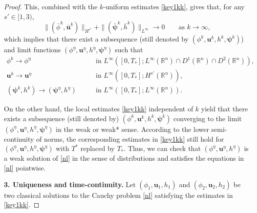 \documentclass[10pt,a4paper]{amsart}
\begin{document}
\begin{proof}
This, combined with the $k$-uniform estimates \eqref{key1kk}, gives that, for any $s'\in [1,3)$,
\begin{equation*}
\|(\bar\phi^{k},\bar {\boldsymbol{u}}^{k})\|_{H^{s'}}+\|(\bar{\boldsymbol{\psi}}^{k},\bar h^{k})\|_{L^\infty}\to 0\qquad \text{as $k\to\infty$},
\end{equation*}
which implies that there exist a subsequence (still denoted by $(\phi^k,\boldsymbol{u}^k,h^k ,\boldsymbol{\psi}^k)$) and limit functions  $(\phi^\eta,\boldsymbol{u}^\eta,h^\eta, \boldsymbol{\psi}^\eta)$ such that
\begin{equation*} 
\begin{aligned}
\phi^k\to \phi^\eta\qquad &\text{in $L^\infty([0,T_*];L^\infty(\mathbb{R}^n)\cap D^1(\mathbb{R}^n)\cap D^2(\mathbb{R}^n))$},\\
\boldsymbol{u}^k\to \boldsymbol{u}^\eta \qquad   &\text{in $L^\infty([0,T_*];H^{s'}(\mathbb{R}^n))$},\\
(\boldsymbol{\psi}^k,h^k)\to (\boldsymbol{\psi}^\eta,h^\eta) \qquad  &\text{in $L^\infty([0,T_*];L^\infty(\mathbb{R}^n))$}.
\end{aligned}
\end{equation*}

On the other hand,    the local estimates  \eqref{key1kk} independent of $k$ yield that there exists a subsequence (still denoted by) $(\phi^k,\boldsymbol{u}^k, h^k, \boldsymbol{\psi}^k)$ converging to the limit $(\phi^\eta,\boldsymbol{u}^\eta, h^\eta, \boldsymbol{\psi}^\eta)$ in the weak or weak* sense.
According to the lower semi-continuity of norms,  the corresponding estimates in \eqref{key1kk} still hold for  $(\phi^\eta,\boldsymbol{u}^\eta, h^\eta,\boldsymbol{\psi}^\eta)$ with $T^*$ replaced by $T_*$. Thus, we can check that  $(\phi^\eta,\boldsymbol{u}^\eta, h^\eta)$ is a weak solution of \eqref{nl} in the sense of distributions and satisfies the equations in \eqref{nl} pointwise.

\smallskip
\textbf{3. Uniqueness and time-continuity.}  Let $(\phi_1,  \boldsymbol{u}_1, h_1)$ and $(\phi_2, \boldsymbol{u}_2, h_2)$ be two classical solutions to the   Cauchy problem \eqref{nl} satisfying the  estimates in \eqref{key1kk}.


\end{proof}
\end{document}
